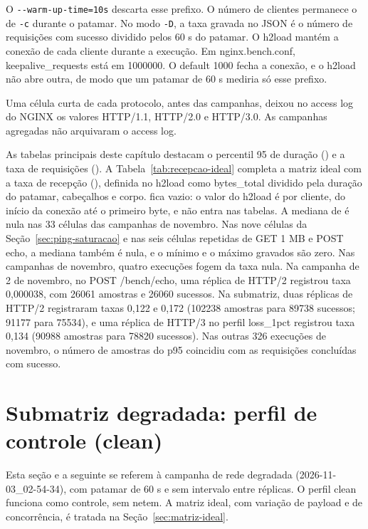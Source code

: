 O \texttt{-{}-warm-up-time=10s} descarta esse prefixo. O número de clientes permanece o de \texttt{-c} durante o patamar. No modo \texttt{-D}, a taxa gravada no JSON é o número de requisições com sucesso dividido pelos 60 s do patamar. O h2load mantém a conexão de cada cliente durante a execução. Em nginx.bench.conf, keepalive\_requests está em 1000000. O default 1000 fecha a conexão, e o h2load não abre outra, de modo que um patamar de 60 s mediria só esse prefixo.

Uma célula curta de cada protocolo, antes das campanhas, deixou no access log do NGINX os valores HTTP/1.1, HTTP/2.0 e HTTP/3.0. As campanhas agregadas não arquivaram o access log.

As tabelas principais deste capítulo destacam o percentil 95 de duração () e a taxa de requisições (). A Tabela~\ref{tab:recepcao-ideal} completa a matriz ideal com a taxa de recepção (), definida no h2load como bytes\_total dividido pela duração do patamar, cabeçalhos e corpo.  fica vazio: o valor do h2load é por cliente, do início da conexão até o primeiro byte, e não entra nas tabelas. A mediana de  é nula nas 33 células das campanhas de novembro. Nas nove células da Seção~\ref{sec:ping-saturacao} e nas seis células repetidas de GET 1 MB e POST echo, a mediana também é nula, e o mínimo e o máximo gravados são zero. Nas campanhas de novembro, quatro execuções fogem da taxa nula. Na campanha de 2 de novembro, no POST /bench/echo, uma réplica de HTTP/2 registrou taxa 0,000038, com 26061 amostras e 26060 sucessos. Na submatriz, duas réplicas de HTTP/2 registraram taxas 0,122 e 0,172 (102238 amostras para 89738 sucessos; 91177 para 75534), e uma réplica de HTTP/3 no perfil loss\_1pct registrou taxa 0,134 (90988 amostras para 78820 sucessos). Nas outras 326 execuções de novembro, o número de amostras do p95 coincidiu com as requisições concluídas com sucesso.

\section{Submatriz degradada: perfil de controle (clean)}\label{sec:submatriz-clean}

Esta seção e a seguinte se referem à campanha de rede degradada (2026-11-03\_02-54-34), com patamar de 60 s e sem intervalo entre réplicas. O perfil clean funciona como controle, sem netem. A matriz ideal, com variação de payload e de concorrência, é tratada na Seção~\ref{sec:matriz-ideal}.


